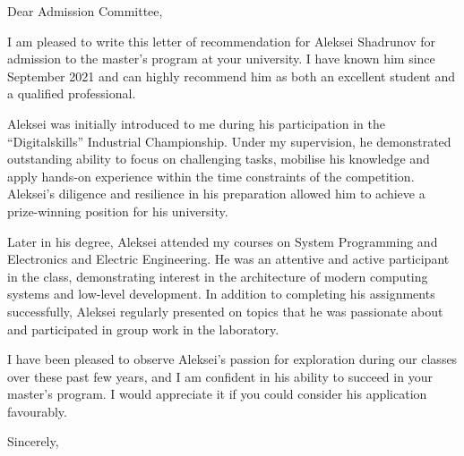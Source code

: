 \documentclass[12pt]{letter}
\begin{document}
\signature{Yaroslav E. Meshcheryakov \\ Associate Professor at the Department of Cyber-Physical Systems Information Security \\ HSE University \\ \url{ymeshcheryakov@hse.ru}}

\begin{letter}{}
\opening{Dear Admission Committee,}

I am pleased to write this letter of recommendation for Aleksei Shadrunov for admission to the master's program at your university. I have known him since September 2021 and can highly recommend him as both an excellent student and a qualified professional.

Aleksei was initially introduced to me during his participation in the “Digitalskills” Industrial Championship. Under my supervision, he demonstrated outstanding ability to focus on challenging tasks, mobilise his knowledge and apply hands-on experience within the time constraints of the competition. Aleksei's diligence and resilience in his preparation allowed him to achieve a prize-winning position for his university.

Later in his degree, Aleksei attended my courses on System Programming and Electronics and Electric Engineering. He was an attentive and active participant in the class, demonstrating interest in the architecture of modern computing systems and low-level development. In addition to completing his assignments successfully, Aleksei regularly presented on topics that he was passionate about and participated in group work in the laboratory.

I have been pleased to observe Aleksei's passion for exploration during our classes over these past few years, and I am confident in his ability to succeed in your master's program. I would appreciate it if you could consider his application favourably.

\closing{Sincerely,}


\end{letter}
\end{document}
